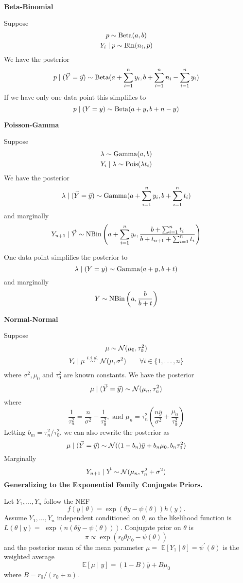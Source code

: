 \documentclass[10pt,landscape]{article}
\begin{document}
\begin{multicols*}{3}
\textbf{Beta-Binomial}

Suppose 
\begin{gather*}
p\sim \operatorname{Beta}(a,b)\\
    Y_i\mid p\sim \operatorname{Bin}(n_i,p)
\end{gather*}
We have the posterior
$$
p\mid (\vec Y=\vec y)\sim \operatorname{Beta}(a+\sum_{i=1}^n y_i,b+\sum_{i=1}^n n_i-\sum_{i=1}^n y_i)
$$
If we have only one data point this simplifies to
$$
p\mid (Y=y)\sim \operatorname{Beta}(a+y,b+n-y)
$$

\textbf{Poisson-Gamma}

Suppose 
\begin{gather*}
\lambda \sim \operatorname{Gamma}(a,b)\\
Y_i\mid \lambda \sim \operatorname{Pois}(\lambda t_i)
\end{gather*}
We have the posterior
$$
\lambda\mid (\vec Y=\vec y)\sim \operatorname{Gamma}(a+\sum_{i=1}^ny_i,b+\sum_{i=1}^nt_i)
$$
and marginally
$$
Y_{n+1}\mid\vec Y \sim \operatorname{NBin}\left(a+\sum_{i=1}^ny_i,\frac{b+\sum_{i=1}^nt_i}{b+t_{n+1}+\sum_{i=1}^nt_i}\right)
$$

One data point simplifies the posterior to
$$
\lambda\mid (Y=y)\sim \operatorname{Gamma}(a+y,b+t)
$$
and marginally
$$
Y\sim \operatorname{NBin}\left(a,\frac{b}{b+t}\right)
$$

\textbf{Normal-Normal}

Suppose 
\begin{gather*}
\mu \sim \mathcal{N}(\mu_0,\tau_0^2)\\
Y_i\mid \mu \stackrel{i.i.d.}{\sim} \mathcal{N}(\mu, \sigma^2)\qquad\forall i\in\{1,\ldots,n\}
\end{gather*}
where $\sigma^2,\mu_0$ and $\tau_0^2$ are known constants. We have the posterior
$$
\mu\mid (\vec Y=\vec y)\sim \mathcal{N}(\mu_n,\tau_n^2)
$$
where
$$
\frac{1}{\tau_n^2}=\frac{n}{\sigma^2}+\frac{1}{\tau_0^2},\text{ and } \mu_n=\tau_n^2\left(\frac{n\bar y}{\sigma^2}+\frac{\mu_0}{\tau_0^2}\right)
$$
Letting $b_m=\tau^2_n/\tau_0^2$, we can also rewrite the posterior as
$$
\mu\mid(\vec Y=\vec y)\sim \mathcal{N}((1-b_n)\bar y+b_n\mu_0,b_n\tau_0^2)
$$
Marginally
$$
Y_{n+1}\mid\vec Y\sim\mathcal{N}(\mu_n,\tau_n^2+\sigma^2)
$$
\textbf{Generalizing to the Exponential Family Conjugate Priors. }

Let $Y_1, \ldots, Y_n$ follow the NEF
$$
f(y \mid \theta)=\exp (\theta y-\psi(\theta)) h(y) .
$$
Assume $Y_1, \ldots, Y_n$ independent conditioned on $\theta$, so the likelihood function is $L(\theta \mid y)=$ $\exp (n(\theta \bar{y}-\psi(\theta)))$. Conjugate prior on $\theta$ is
$$
\pi \propto \exp \left(r_0 \theta \mu_0-\psi(\theta)\right)
$$
and the posterior mean of the mean parameter $\mu=$ $\mathbb{E}\left[Y_1 \mid \theta\right]=\psi^{\prime}(\theta)$ is the weighted average
$$
\mathbb{E}[\mu \mid y]=(1-B) \bar{y}+B \mu_0
$$
where $B=r_0 /\left(r_0+n\right)$.


\end{multicols*}
\end{document}
